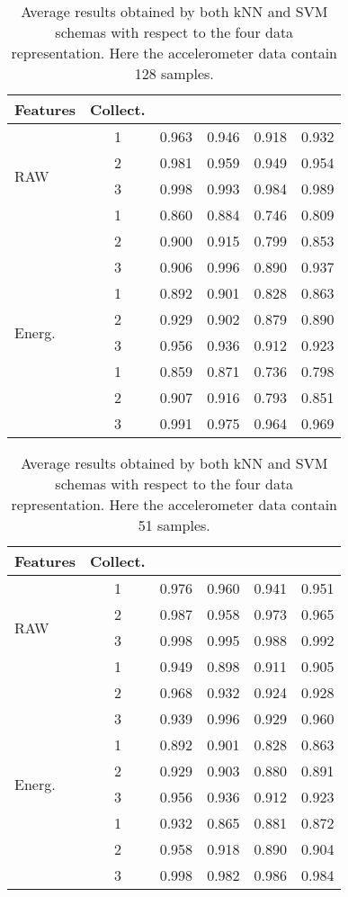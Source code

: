 \documentclass[twocolumn]{svjour3}          \smartqed  \usepackage[draft]{hyperref}
\begin{document}
 
 \begin{table}[tb]
\scriptsize
\centering
\begin{tabular}{lccccc}
	Features&Collect.	&	 &	 &		&	 \\
\hline \multirow{4}{*}{RAW}	&1&	0.963&	0.946&	0.918&	0.932\\ 
&2&	0.981&	0.959&	0.949&	0.954\\ 
&3&	0.998&	0.993&	0.984&	0.989\\ 
[2pt] 
\hline 
\multirow{4}{*}{Magn.}	&1&	0.860&	0.884&	0.746&	0.809\\ 
&2&	0.900&	0.915&	0.799&	0.853\\ 
&3&	0.906&	0.996&	0.890&	0.937\\ 
[2pt] 
\hline 
\multirow{4}{*}{Energ.}	&1&	0.892&	0.901&	0.828&	0.863\\ 
&2&	0.929&	0.902&	0.879&	0.890\\ 
&3&	0.956&	0.936&	0.912&	0.923\\ 
[2pt] 
\hline 
\multirow{4}{*}{LTP}	&1&	0.859&	0.871&	0.736&	0.798\\ 
&2&	0.907&	0.916&	0.793&	0.851\\ 
&3&	0.991&	0.975&	0.964&	0.969\\ 
[2pt] 
\hline 
\end{tabular}
\medskip
\caption{Average results obtained by both kNN and SVM schemas with respect to the four data representation. Here the accelerometer data contain 128 samples.}
\label{table:summary-2-128}
 \end{table}
 

 \begin{table}[tb]
\scriptsize
\centering
\begin{tabular}{lccccc}
	Features&Collect.	&	 &	 &		&	 \\
\hline \multirow{4}{*}{RAW}	&1&	0.976&	0.960&	0.941&	0.951\\ 
&2&	0.987&	0.958&	0.973&	0.965\\ 
&3&	0.998&	0.995&	0.988&	0.992\\ 
[2pt] 
\hline 
\multirow{4}{*}{Magn.}	&1&	0.949&	0.898&	0.911&	0.905\\ 
&2&	0.968&	0.932&	0.924&	0.928\\ 
&3&	0.939&	0.996&	0.929&	0.960\\ 
[2pt] 
\hline 
\multirow{4}{*}{Energ.}	&1&	0.892&	0.901&	0.828&	0.863\\ 
&2&	0.929&	0.903&	0.880&	0.891\\ 
&3&	0.956&	0.936&	0.912&	0.923\\ 
[2pt] 
\hline 
\multirow{4}{*}{LTP}	&1&	0.932&	0.865&	0.881&	0.872\\ 
&2&	0.958&	0.918&	0.890&	0.904\\ 
&3&	0.998&	0.982&	0.986&	0.984\\ 
[2pt] 
\hline 
\end{tabular}
\medskip
\caption{Average results obtained by both kNN and SVM schemas with respect to the four data representation. Here the accelerometer data contain 51 samples.}
\label{table:summary-2-51}
 \end{table}
 
\end{document}
